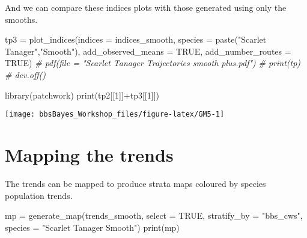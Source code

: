 \documentclass[
]{book}
\newenvironment{Shaded}{\begin{snugshade}}{\end{snugshade}}
\newcommand{\AttributeTok}[1]{\textcolor[rgb]{0.77,0.63,0.00}{#1}}
\newcommand{\CommentTok}[1]{\textcolor[rgb]{0.56,0.35,0.01}{\textit{#1}}}
\newcommand{\ConstantTok}[1]{\textcolor[rgb]{0.00,0.00,0.00}{#1}}
\newcommand{\DecValTok}[1]{\textcolor[rgb]{0.00,0.00,0.81}{#1}}
\newcommand{\FunctionTok}[1]{\textcolor[rgb]{0.00,0.00,0.00}{#1}}
\newcommand{\NormalTok}[1]{#1}
\newcommand{\OtherTok}[1]{\textcolor[rgb]{0.56,0.35,0.01}{#1}}
\newcommand{\SpecialCharTok}[1]{\textcolor[rgb]{0.00,0.00,0.00}{#1}}
\newcommand{\StringTok}[1]{\textcolor[rgb]{0.31,0.60,0.02}{#1}}
\begin{document}
And we can compare these indices plots with those generated using only the smooths.

\begin{Shaded}
\begin{Highlighting}[]
\NormalTok{tp3 }\OtherTok{=} \FunctionTok{plot\_indices}\NormalTok{(}\AttributeTok{indices =}\NormalTok{ indices\_smooth,}
                         \AttributeTok{species =} \FunctionTok{paste}\NormalTok{(}\StringTok{"Scarlet Tanager"}\NormalTok{,}\StringTok{"Smooth"}\NormalTok{),}
                  \AttributeTok{add\_observed\_means =} \ConstantTok{TRUE}\NormalTok{,}
                  \AttributeTok{add\_number\_routes =} \ConstantTok{TRUE}\NormalTok{)}
 \CommentTok{\# pdf(file = "Scarlet Tanager Trajectories smooth plus.pdf")}
 \CommentTok{\# print(tp)}
 \CommentTok{\# dev.off()}
\end{Highlighting}
\end{Shaded}

\begin{Shaded}
\begin{Highlighting}[]
\FunctionTok{library}\NormalTok{(patchwork)}
\FunctionTok{print}\NormalTok{(tp2[[}\DecValTok{1}\NormalTok{]]}\SpecialCharTok{+}\NormalTok{tp3[[}\DecValTok{1}\NormalTok{]])}
\end{Highlighting}
\end{Shaded}

\begin{center}\texttt{[image: bbsBayes\_Workshop\_files/figure-latex/GM5-1]} \end{center}

\hypertarget{mapping-the-trends}{%
\section{Mapping the trends}\label{mapping-the-trends}}

The trends can be mapped to produce strata maps coloured by species population trends.

\begin{Shaded}
\begin{Highlighting}[]
\NormalTok{mp }\OtherTok{=} \FunctionTok{generate\_map}\NormalTok{(trends\_smooth,}
                  \AttributeTok{select =} \ConstantTok{TRUE}\NormalTok{,}
                  \AttributeTok{stratify\_by =} \StringTok{"bbs\_cws"}\NormalTok{,}
                  \AttributeTok{species =} \StringTok{"Scarlet Tanager Smooth"}\NormalTok{)}
\FunctionTok{print}\NormalTok{(mp)}
\end{Highlighting}
\end{Shaded}
\end{document}
